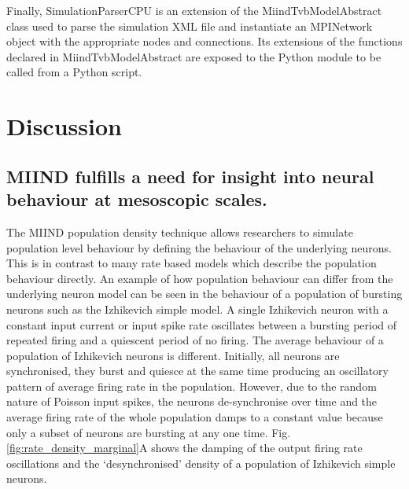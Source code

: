 \documentclass[utf8]{frontiersSCNS} %
\begin{document}
Finally, SimulationParserCPU is an extension of the MiindTvbModelAbstract class used to parse the simulation XML file and instantiate an MPINetwork object with the appropriate nodes and connections. Its extensions of the functions declared in MiindTvbModelAbstract are exposed to the Python module to be called from a Python script. 

\section{Discussion}

\subsection*{MIIND fulfills a need for insight into neural behaviour at mesoscopic scales.}
The MIIND population density technique allows researchers to simulate population level behaviour by defining the behaviour of the underlying neurons. This is in contrast to many rate based models which describe the population behaviour directly. An example of how population behaviour can differ from the underlying neuron model can be seen in the behaviour of a population of bursting neurons such as the Izhikevich simple model. A single Izhikevich neuron with a constant input current or input spike rate oscillates between a bursting period of repeated firing and a quiescent period of no firing. The average behaviour of a population of Izhikevich neurons is different. Initially, all neurons are synchronised, they burst and quiesce at the same time producing an oscillatory pattern of average firing rate in the population. However, due to the random nature of Poisson input spikes, the neurons de-synchronise over time and the average firing rate of the whole population damps to a constant value because only a subset of neurons are bursting at any one time. Fig. \ref{fig:rate_density_marginal}A shows the damping of the output firing rate oscillations and the `desynchronised' density of a population of Izhikevich simple neurons.\\ 
\end{document}
